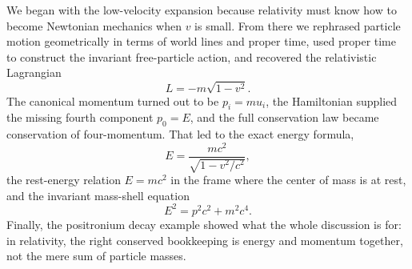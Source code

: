 We began with the low-velocity expansion because relativity must know how to become Newtonian mechanics when \(v\) is small. From there we rephrased particle motion geometrically in terms of world lines and proper time, used proper time to construct the invariant free-particle action, and recovered the relativistic Lagrangian
\begin{equation}
L=-m\sqrt{1-v^2}.
\end{equation}
The canonical momentum turned out to be \(p_i=mu_i\), the Hamiltonian supplied the missing fourth component \(p_0=E\), and the full conservation law became conservation of four-momentum. That led to the exact energy formula,
\begin{equation}
E=\frac{mc^2}{\sqrt{1-v^2/c^2}},
\end{equation}
the rest-energy relation \(E=mc^2\) in the frame where the center of mass is at rest, and the invariant mass-shell equation
\begin{equation}
E^2=p^2c^2+m^2c^4.
\end{equation}
Finally, the positronium decay example showed what the whole discussion is for: in relativity, the right conserved bookkeeping is energy and momentum together, not the mere sum of particle masses.